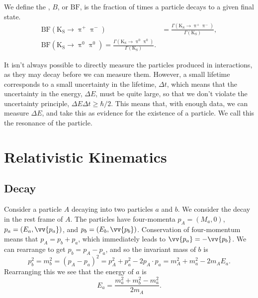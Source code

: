 \documentclass[fleqn]{NotesClass}
\makeatletter
\newcommand{\PBASE@pion}{\uppi}
\newcommand{\Ppiplus}{\ensuremath{\PBASE@pion^+}}
\newcommand{\Ppiminus}{\ensuremath{\PBASE@pion^-}}
\newcommand{\Ppineutral}{\ensuremath{\PBASE@pion^0}}
\newcommand{\Ppizero}{\Ppineutral}
\newcommand{\PBASE@kaon}{\mathrm{K}}
\newcommand{\PKshort}{\ensuremath{\PBASE@kaon_{\mathrm{S}}}}
\newcommand*{\branchingfraction}{\mathrm{BF}}
\makeatother
\begin{document}
    We define the , \(B\), or \(\branchingfraction\), is the fraction of times a particle decays to a given final state.
    \begin{align}
        \branchingfraction(\PKshort \to \Ppiplus\Ppiminus) &= \frac{\Gamma(\PKshort \to \Ppiplus\Ppiminus)}{\Gamma(\PKshort)},\\
        \branchingfraction(\PKshort \to \Ppizero\Ppizero) = \frac{\Gamma(\PKshort \to \Ppizero\Ppizero)}{\Gamma(\PKshort)}.
    \end{align}
    
    It isn't always possible to directly measure the particles produced in interactions, as they may decay before we can measure them.
    However, a small lifetime corresponds to a small uncertainty in the lifetime, \(\Delta t\), which means that the uncertainty in the energy, \(\Delta E\), must be quite large, so that we don't violate the uncertainty principle, \(\Delta E \Delta t \ge \hbar/2\).
    This means that, with enough data, we can measure \(\Delta E\), and take this as evidence for the existence of a particle.
    We call this the resonance of the particle.
    
    \section{Relativistic Kinematics}
    \subsection{Decay}
    Consider a particle \(A\) decaying into two particles \(a\) and \(b\).
    We consider the decay in the rest frame of \(A\).
    The particles have four-momenta \(p_A = (M_a, 0)\), \(p_a = (E_a, \vv{p_a})\), and \(p_b = (E_b, \vv{p_b})\).
    Conservation of four-momentum means that \(p_A = p_b + p_a\), which immediately leads to \(\vv{p_a} = -\vv{p_b}\).
    We can rearrange to get \(p_b = p_A - p_a\), and so the invariant mass of \(b\) is
    \begin{equation}
        p_b^2 = m_b^2 = (p_A - p_a)^2 = p_A^2 + p_a^2 - 2p_A \cdot p_a = m_A^2 + m_a^2 - 2m_AE_a.
    \end{equation}
    Rearranging this we see that the energy of \(a\) is
    \begin{equation}
        E_a = \frac{m_a^2 + m_b^2 - m_a^2}{2m_A}.
    \end{equation}
    
\end{document}
